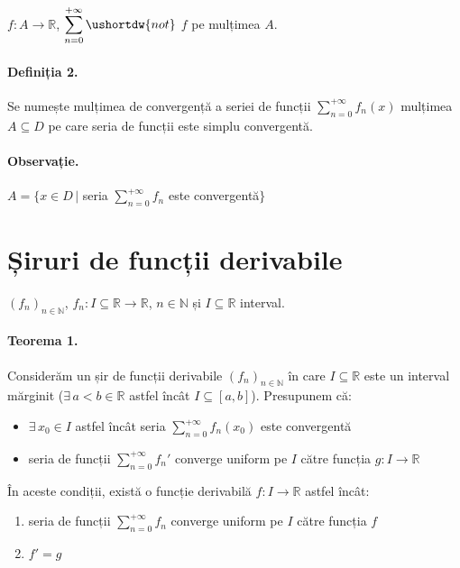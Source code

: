 \hspace{49pt}$f: A \rightarrow \mathbb{R}$, $\displaystyle\sum_{n=0}^{+\infty} \ushortdw{not}$  $f$ pe mulțimea $A$.

\paragraph*{Definiția 2.}
Se numește mulțimea de convergență a seriei de funcții $\displaystyle\sum_{n=0}^{+\infty}f_{n}(x)$ mulțimea $A \subseteq D$ pe care seria de funcții este simplu convergentă.
 
\paragraph*{Observație.} 
$A = \{x \in D \, \vert$ seria $\displaystyle\sum_{n=0}^{+\infty}f_{n}$ este convergentă$\}$

\pagebreak

\section{Șiruri de funcții derivabile}
$(f_{n})_{n \in \mathbb{N}}$, $f_{n}: I \subseteq \mathbb{R} \rightarrow \mathbb{R}$, $n \in \mathbb{N}$ și $I \subseteq \mathbb{R}$ interval.

\paragraph*{Teorema 1.}
Considerăm un șir de funcții derivabile $(f_{n})_{n \in \mathbb{N}}$ în
care $I \subseteq \mathbb{R}$ este un interval mărginit ($\exists \, a<b
\in \mathbb{R}$ astfel încât $I\subseteq[a,b]$). Presupunem că:
\begin{itemize}
	\item $\exists \, x_{0} \in I$ astfel încât seria $\displaystyle\sum_{n=0}^{+\infty}f_{n}(x_{0})$ este convergentă
	\item seria de funcții $\displaystyle\sum_{n=0}^{+\infty}f_{n}'$ converge uniform pe $I$ către funcția $g:I \rightarrow \mathbb{R}$ 
\end{itemize}

În aceste condiții, există o funcție derivabilă $f: I \rightarrow \mathbb{R}$ astfel încât:

\begin{enumerate}[label=\emph{\alph*})]
	\item seria de funcții $\displaystyle\sum_{n=0}^{+\infty}f_{n}$
    converge uniform pe $I$ către funcția $f$
	\item $f' = g$
\end{enumerate}

